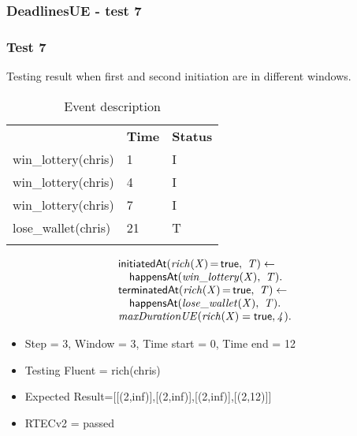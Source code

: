 \documentclass[8pt]{beamer}
\DeclareMathOperator{\val}{=}  %
\def \patsize {}
\def\happensAt{\textsf{\patsize happensAt}}
\def\initiatedAt{\textsf{\patsize initiatedAt}}
\def\terminatedAt{\textsf{\patsize terminatedAt}}
\def\true{\textsf{\patsize true}}
\newenvironment{mysplit}%
  {\arraycolsep 0pt \begin{array}{l}}%
  {\end{array}}
\begin{document}
\begin{frame}
    \frametitle{DeadlinesUE - test 7}
    \subsubsection{Test 7}
    \small
    Testing result when first and second initiation are in different windows.\linebreak
    \begin{minipage}{0.48\linewidth}
        \begin{table}[t!]
            \caption{Event description}
            \begin{center}

                \begin{tabular}{lll}
                    \hline\noalign{\smallskip}
                    \multicolumn{1}{l}{\textbf{Event}} & \multicolumn{1}{c}{\textbf{Time}} & \multicolumn{1}{c}{\textbf{Status}} \\
                    win\_lottery(chris)& 1 & I\\
                    win\_lottery(chris)& 4 & I\\
                    win\_lottery(chris)& 7 & I\\
                    lose\_wallet(chris)& 21 & T\\
                    \noalign{\smallskip}
                    \hline
                \end{tabular}
            \end{center}
        \end{table}
    \end{minipage}
    \begin{minipage}{0.48\linewidth}
        \begin{align*}
            \begin{mysplit}
                \initiatedAt\mathit{(rich(X)\val\true,\ T) \leftarrow}\\
                \quad    \happensAt\mathit{(win\_lottery(X),\ T).}\\
                \terminatedAt\mathit{(rich(X)\val\true,\ T) \leftarrow}\\
                \quad    \happensAt\mathit{(lose\_wallet(X),\ T)}.\\
                \mathit{maxDurationUE(rich(X)=\true,4)}.\\
            \end{mysplit}
        \end{align*}
    \end{minipage}
    \begin{itemize}
        \item Step = 3, Window = 3, Time start = 0, Time end = 12
        \item Testing Fluent = rich(chris)
        \item Expected Result=[[(2,inf)],[(2,inf)],[(2,inf)],[(2,12)]]
        \item RTECv2 = passed
    \end{itemize}
\end{frame}
\end{document}
